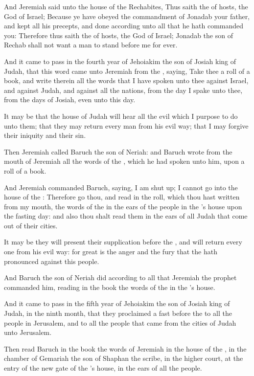 \Verse And Jeremiah said unto the house of the Rechabites, Thus saith the \LORD of hosts, the God of Israel; Because ye have obeyed the commandment of Jonadab your father, and kept all his precepts, and done according unto all that he hath commanded you: \Verse Therefore thus saith the \LORD of hosts, the God of Israel; Jonadab the son of Rechab shall not want a man to stand before me for ever.


\Chapter
\Verse And it came to pass in the fourth year of Jehoiakim the son of Josiah king of Judah, that this word came unto Jeremiah from the \LORD, saying, \Verse Take thee a roll of a book, and write therein all the words that I have spoken unto thee against Israel, and against Judah, and against all the nations, from the day I spake unto thee, from the days of Josiah, even unto this day.

\Verse It may be that the house of Judah will hear all the evil which I purpose to do unto them; that they may return every man from his evil way; that I may forgive their iniquity and their sin.

\Verse Then Jeremiah called Baruch the son of Neriah: and Baruch wrote from the mouth of Jeremiah all the words of the \LORD, which he had spoken unto him, upon a roll of a book.

\Verse And Jeremiah commanded Baruch, saying, I am shut up; I cannot go into the house of the \LORD: \Verse Therefore go thou, and read in the roll, which thou hast written from my mouth, the words of the \LORD in the ears of the people in the \LORD's house upon the fasting day: and also thou shalt read them in the ears of all Judah that come out of their cities.

\Verse It may be they will present their supplication before the \LORD, and will return every one from his evil way: for great is the anger and the fury that the \LORD hath pronounced against this people.

\Verse And Baruch the son of Neriah did according to all that Jeremiah the prophet commanded him, reading in the book the words of the \LORD in the \LORD's house.

\Verse And it came to pass in the fifth year of Jehoiakim the son of Josiah king of Judah, in the ninth month, that they proclaimed a fast before the \LORD to all the people in Jerusalem, and to all the people that came from the cities of Judah unto Jerusalem.

\Verse Then read Baruch in the book the words of Jeremiah in the house of the \LORD, in the chamber of Gemariah the son of Shaphan the scribe, in the higher court, at the entry of the new gate of the \LORD's house, in the ears of all the people.

